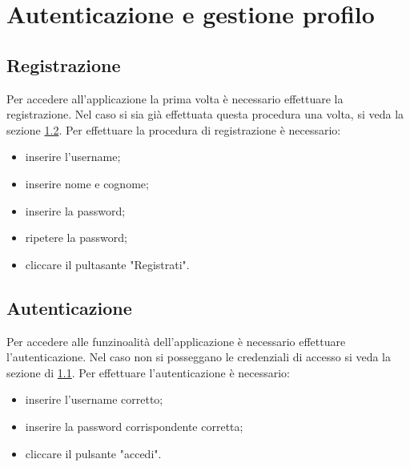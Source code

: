 \documentclass[12pt,a4paper]{article}
\begin{document}
	\section{Autenticazione e gestione profilo}
	\subsection{Registrazione}\label{registrazione}
	Per accedere all'applicazione la prima volta è necessario effettuare la registrazione. Nel caso si sia già effettuata questa procedura una volta, si veda la sezione \ref{autenticazione}.
	Per effettuare la procedura di registrazione è necessario:
	\begin{itemize}
		\item inserire l'username;
		\item inserire nome e cognome;
		\item inserire la password;
		\item ripetere la password;
		\item cliccare il pultasante "Registrati". 
	\end{itemize}
\begin{comment}
\begin{figure}[h]
		
\centering
\texttt{[image: ]}
\caption{}
\label{Schermata di registrazione}
\end{figure}

\end{comment}

	\subsection{Autenticazione}\label{autenticazione}
	Per accedere alle funzinoalità dell'applicazione è necessario effettuare l'autenticazione. Nel caso non si posseggano le credenziali di accesso si veda la sezione di \ref{registrazione}.
	Per effettuare l'autenticazione è necessario:
		\begin{itemize}
			\item inserire l'username corretto;
			\item inserire la password corrispondente corretta;
			\item cliccare il pulsante "accedi".
		\end{itemize}
		\begin{comment}
		\begin{figure}[h]
		
		\centering
		\texttt{[image: ]}
		\caption{}
		\label{Schermata di autenticazione}
		\end{figure}
		
		\end{comment}
\end{document}
